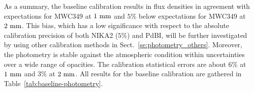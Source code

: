 As a summary, the baseline calibration results in flux densities in
agreement with expectations for MWC349 at $1~\rm{mm}$ and $5\%$ below
expectations for MWC349 at $2~\rm{mm}$. This bias, which has a low
significance with respect to the absolute calibration precision of
both NIKA2 ($5\%$) and PdBI, will be further investigated by using other
calibration methods in Sect.~\ref{se:photometry_others}. Moreover, the
photometry is stable against the atmospheric condition within
uncertainties over a wide range of opacities. The calibration
statistical errors are about $6\%$ at $1~\rm{mm}$ and $3\%$ at
$2~\rm{mm}$. All results for the baseline calibration are gathered in
Table~\ref{tab:baseline-photometry}.


